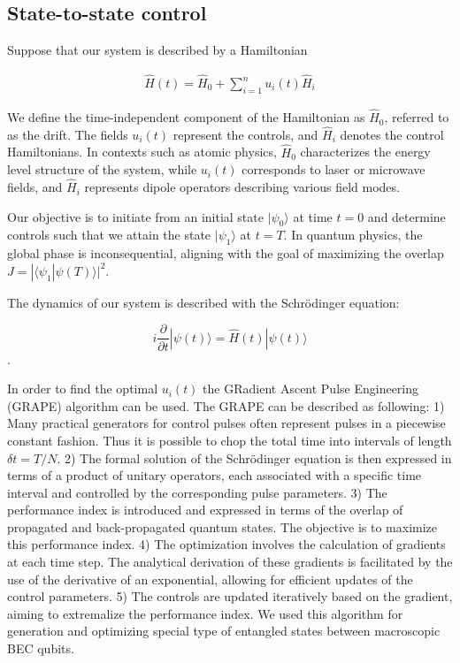 \documentclass[
aps,%
12pt,%
final,%
notitlepage,%
oneside,%
onecolumn,%
nobibnotes,%
nofootinbib,%
superscriptaddress,%
noshowpacs,%
centertags]%
{revtex4}
\begin{document}
\subsection{State-to-state control}

Suppose that our system is described by a Hamiltonian

\begin{align}
\hat{H}(t) = \hat{H}_0 + \sum_{i=1}^{n} u_i(t) \hat{H}_i
\end{align}

We define the time-independent component of the Hamiltonian as $\hat{H}_0$, referred to as the drift. The fields $u_i(t)$ represent the controls, and $\hat{H}_i$ denotes the control Hamiltonians. In contexts such as atomic physics, $\hat{H}_0$ characterizes the energy level structure of the system, while $u_i(t)$ corresponds to laser or microwave fields, and $\hat{H}_i$ represents dipole operators describing various field modes.



Our objective is to initiate from an initial state $|\psi_0\rangle$ at time $t = 0$ and determine controls such that we attain the state $|\psi_1\rangle$ at $t = T$. In quantum physics, the global phase is inconsequential, aligning with the goal of maximizing the overlap $J = |\langle \psi_1 | \psi(T)\rangle|^2$.

The dynamics of our system is described with the Schrödinger equation:

$$i \frac{\partial}{\partial t} |\psi(t)\rangle = \hat{H}(t) |\psi(t)\rangle$$.

In order to find the optimal $u_i(t)$ the GRadient Ascent Pulse Engineering (GRAPE) algorithm \cite{Khaneja2005} can be used. The GRAPE can be described as following: 1) Many practical generators for control pulses often represent pulses in a piecewise constant fashion. Thus it is possible to chop the total time into intervals of length $\delta t = T/N$. 2) The formal solution of the Schrödinger equation is then expressed in terms of a product of unitary operators, each associated with a specific time interval and controlled by the corresponding pulse parameters. 3) The performance index is introduced and expressed in terms of the overlap of propagated and back-propagated quantum states. The objective is to maximize this performance index. 4) The optimization involves the calculation of gradients at each time step. The analytical derivation of these gradients is facilitated by the use of the derivative of an exponential, allowing for efficient updates of the control parameters. 5) The controls are updated iteratively based on the gradient, aiming to extremalize the performance index. We used this algorithm for generation and optimizing special type of entangled states between macroscopic BEC qubits.
\end{document}
